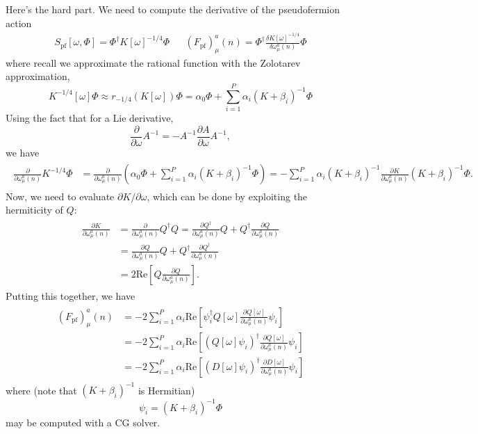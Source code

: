 Here's the hard part. We need to compute the derivative of the pseudofermion action
\begin{align}
	S_\mathrm{pf}[\omega, \Phi] = \Phi^\dagger K[\omega]^{-1/4} \Phi &&
	(F_\mathrm{pf})_\mu^a(n) = \Phi^\dagger \frac{\delta K[\omega]^{-1/4}}{\delta\omega_\mu^a(n)} \Phi
\end{align}
where recall we approximate the rational function with the Zolotarev approximation,
\begin{equation}
	K^{-1/4}[\omega]\Phi\approx r_{-1/4}(K[\omega]) \Phi = \alpha_0\Phi + \sum_{i = 1}^P \alpha_i (K + \beta_i)^{-1}\Phi
\end{equation}
Using the fact that for a Lie derivative,
\begin{equation}
	\frac{\partial}{\partial\omega} A^{-1} = -A^{-1} \frac{\partial A}{\partial\omega} A^{-1},
\end{equation}
we have
\begin{align}\begin{split}
	\frac{\partial}{\partial\omega_\mu^a(n)} K^{-1/4} \Phi &= \frac{\partial}{\partial\omega_\mu^a(n)} \left( \alpha_0\Phi + \sum_{i = 1}^P \alpha_i (K + \beta_i)^{-1} \Phi\right) = -\sum_{i = 1}^P \alpha_i (K + \beta_i)^{-1} \frac{\partial K}{\partial\omega_\mu^a(n)} (K + \beta_i)^{-1} \Phi.
\end{split}\end{align}
Now, we need to evaluate $\partial K / \partial\omega$, which can be done by exploiting the hermiticity of $Q$:
\begin{align}\begin{split}
	\frac{\partial K}{\partial\omega_\mu^a(n)} &= \frac{\partial}{\partial\omega_\mu^a(n)} Q^\dagger Q = \frac{\partial Q^\dagger}{\partial\omega_\mu^a(n)} Q + Q^\dagger \frac{\partial Q}{\partial\omega_\mu^a(n)} \\
	&= \frac{\partial Q}{\partial\omega_\mu^a(n)} Q + Q^\dagger \frac{\partial Q^\dagger}{\partial\omega_\mu^a(n)} \\
	&= 2\mathrm{Re}\left[ Q\frac{\partial Q}{\partial\omega_\mu^a(n)} \right].
\end{split}\end{align}
Putting this together, we have
\begin{align}\begin{split}
	(F_\mathrm{pf})_\mu^a(n) &= -2\sum_{i = 1}^P \alpha_i \mathrm{Re} \left[ \psi_i^\dagger Q[\omega] \frac{\partial Q[\omega]}{\partial\omega_\mu^a(n)} \psi_i \right] \\
	&= -2\sum_{i = 1}^P \alpha_i \mathrm{Re} \left[  (Q[\omega] \psi_i )^\dagger \frac{\partial Q[\omega]}{\partial\omega_\mu^a(n)} \psi_i \right] \\
	&= -2\sum_{i = 1}^P \alpha_i \mathrm{Re} \left[  (D[\omega] \psi_i )^\dagger \frac{\partial D[\omega]}{\partial\omega_\mu^a(n)} \psi_i \right]
\end{split}\end{align}
where (note that $(K+\beta_i)^{-1}$ is Hermitian)
\begin{equation}
	\psi_i = (K + \beta_i)^{-1} \Phi
\end{equation}
may be computed with a CG solver. 

